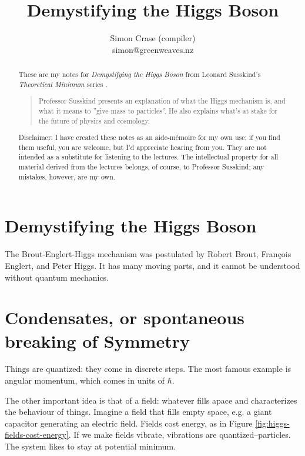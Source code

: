 \documentclass[]{article}
\title{Demystifying the Higgs Boson}
\author{Simon Crase (compiler)\\simon@greenweaves.nz}
\begin{document}
\maketitle

\begin{abstract}
These are my notes for \emph{Demystifying the Higgs Boson}  from Leonard Susskind's \emph{Theoretical Minimum} series \cite[Demystifying the Higgs Boson]{susskind2007theoretical}.

\begin{quotation}
	Professor Susskind presents an explanation of what the Higgs mechanism is, and what it means to ''give mass to particles''. He also explains what's at stake for the future of physics and cosmology.
\end{quotation}

Disclaimer: I have created these notes as an aide-m\'emoire for my own use; if you find them useful, you are welcome, but I'd appreciate hearing from you. They are not intended as a substitute for listening to the lectures. The intellectual property for all material derived from the lectures belongs, of course, to Professor Susskind; any mistakes, however, are my own.


\end{abstract}

\tableofcontents
\listoffigures
\listoftables
\listoftheorems

\section{Demystifying the Higgs Boson}

The  Brout-Englert-Higgs mechanism was postulated by Robert Brout, Fran\c{c}ois Englert, and Peter Higgs. It has many moving parts, and it cannot be understood without quantum mechanics.

\section{Condensates, or spontaneous breaking of Symmetry}

Things are quantized: they come in discrete steps. The most famous example is angular momentum, which comes in units of $\hbar$.

The other important idea is that of a field: whatever fills apace and characterizes the behaviour of things. Imagine a field that fills empty space, e.g. a giant capacitor generating an electric field. Fields cost energy, as in Figure \ref{fig:higgs-fields-cost-energy}. If we make fields vibrate, vibrations are quantized--particles. The system likes to stay at potential minimum.
\end{document}
